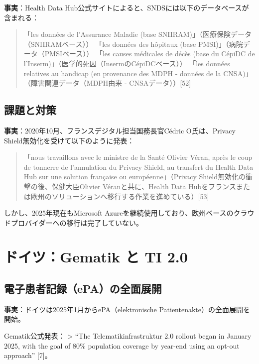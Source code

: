 \documentclass[
  a4paper,
  a4paper,
  11pt]{ltjsbook}
\begin{document}
\textbf{事実}：Health Data
Hub公式サイトによると、SNDSには以下のデータベースが含まれる：

\begin{quote}
「les données de l'Assurance Maladie (base
SNIIRAM)」（医療保険データ（SNIIRAMベース）） 「les données des hôpitaux
(base PMSI)」（病院データ（PMSIベース）） 「les causes médicales de
décès (base du CépiDC de
l'Inserm)」（医学的死因（InsermのCépiDCベース）） 「les données
relatives au handicap (en provenance des MDPH - données de la
CNSA)」（障害関連データ（MDPH由来 - CNSAデータ））{[}52{]}
\end{quote}

\subsection{課題と対策}\label{ux8ab2ux984cux3068ux5bfeux7b56}

\textbf{事実}：2020年10月、フランスデジタル担当国務長官Cédric
O氏は、Privacy Shield無効化を受けて以下のように発表：

\begin{quote}
「nous travaillons avec le ministre de la Santé Olivier Véran, après le
coup de tonnerre de l'annulation du Privacy Shield, au transfert du
Health Data Hub sur une solution française ou européenne」（Privacy
Shield無効化の衝撃の後、保健大臣Olivier Véranと共に、Health Data
Hubをフランスまたは欧州のソリューションへ移行する作業を進めている）{[}53{]}
\end{quote}

しかし、2025年現在もMicrosoft
Azureを継続使用しており、欧州ベースのクラウドプロバイダーへの移行は完了していない。

\section{ドイツ：Gematik と TI
2.0}\label{ux30c9ux30a4ux30c4gematik-ux3068-ti-2.0}

\subsection{電子患者記録（ePA）の全面展開}\label{ux96fbux5b50ux60a3ux8005ux8a18ux9332epaux306eux5168ux9762ux5c55ux958b}

\textbf{事実}：ドイツは2025年1月からePA（elektronische
Patientenakte）の全面展開を開始。

Gematik公式発表： \textgreater{} ``The Telematikinfrastruktur 2.0
rollout began in January 2025, with the goal of 80\% population coverage
by year-end using an opt-out approach'' {[}7{]}。
\end{document}
